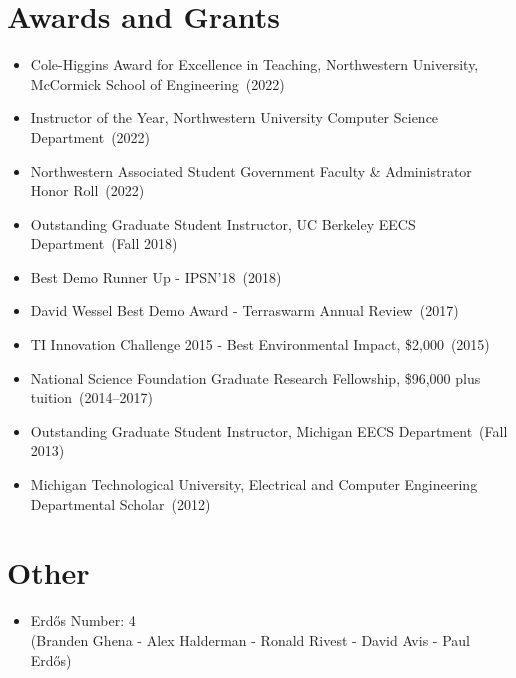 \documentclass{article}
\begin{document}
\section*{Awards and Grants}
\vspace{-6pt}
\begin{itemize}
  \item[] Cole-Higgins Award for Excellence in Teaching, Northwestern University, McCormick School of Engineering~(2022)
  \item[] Instructor of the Year, Northwestern University Computer Science Department~(2022)
  \item[] Northwestern Associated Student Government Faculty \& Administrator Honor Roll~(2022)
  \item[] Outstanding Graduate Student Instructor, UC Berkeley EECS Department~(Fall 2018)
  \item[] Best Demo Runner Up - IPSN'18~(2018)
  \item[] David Wessel Best Demo Award - Terraswarm Annual Review~(2017)
  \item[] TI Innovation Challenge 2015 - Best Environmental Impact, \$2,000~(2015)
  \item[] National Science Foundation Graduate Research Fellowship, \$96,000 plus tuition~(2014--2017)
  \item[] Outstanding Graduate Student Instructor, Michigan EECS Department~(Fall 2013)
  \item[] Michigan Technological University, Electrical and Computer Engineering Departmental Scholar~(2012)
\end{itemize}

\section*{Other}
\vspace{-6pt}
\begin{itemize}
  \item[] Erdős Number: 4\\(Branden Ghena - Alex Halderman - Ronald Rivest - David Avis - Paul Erdős)
\end{itemize}
\end{document}
